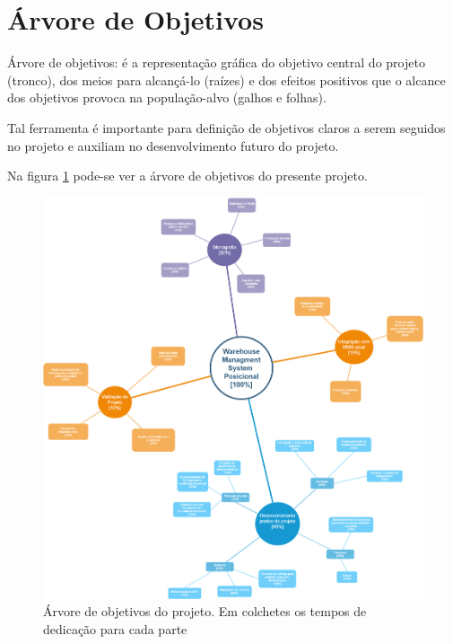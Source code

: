 \section{Árvore de Objetivos}
Árvore de objetivos: é a representação gráfica do objetivo central do projeto (tronco), dos meios para alcançá-lo (raízes) e dos efeitos positivos que o alcance dos objetivos provoca na população-alvo (galhos e folhas). \cite{Buvinich}

Tal ferramenta é importante para definição de objetivos claros a serem seguidos no projeto e auxiliam no desenvolvimento futuro do projeto.

Na figura \ref{fig:arvore_objetivos} pode-se ver a árvore de objetivos do presente projeto.

\begin{figure}
	\includegraphics[width=\linewidth]{images/arvore_objetivos.png}
	\caption{Árvore de objetivos do projeto. Em colchetes os tempos de dedicação para cada parte}
	\label{fig:arvore_objetivos}
  \end{figure}